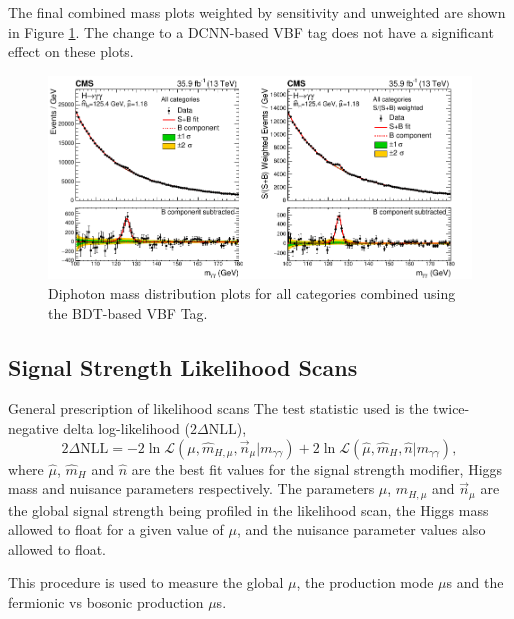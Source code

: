 The final combined mass plots weighted by sensitivity and unweighted are shown in Figure \ref{fig:stats_results:comb_mass_plots}. The change to a DCNN-based VBF tag does not have a significant effect on these plots.
\begin{figure}[h!]
    \begin{center}
        \includegraphics[width=1.0\textwidth]{figures/stats_results/CMS-HIG-16-040_Figure_014.pdf}
    \end{center}
    \caption{Diphoton mass distribution plots for all categories combined using the BDT-based VBF Tag.}
        \label{fig:stats_results:comb_mass_plots}
\end{figure}








\subsection{Signal Strength Likelihood Scans}
General prescription of likelihood scans
The test statistic used is the twice-negative delta log-likelihood ($2\Delta{\mathrm{NLL}}$), 
\begin{equation}
    2\Delta{\mathrm{NLL}} = -2\ln{\mathcal{L}}(\mu,\hat{m}_{H,\mu},\vec{n}_{\mu} | m_{\gamma\gamma}) + 2\ln\mathcal{L}(\hat{\mu},\hat{m}_{H},\hat{n} | m_{\gamma\gamma}),
\end{equation}
where $\hat{\mu}$, $\hat{m}_{H}$ and $\hat{n}$ are the best fit values for the signal strength modifier, Higgs mass and nuisance parameters respectively. 
The parameters $\mu$, $\hat{m}_{H,\mu}$ and $\vec{n}_{\mu}$ are the global signal strength being profiled in the likelihood scan, the Higgs mass allowed to float for a given value of $\mu$, and the nuisance parameter values also allowed to float. 

This procedure is used to measure the global $\mu$, the production mode $\mu$s and the fermionic vs bosonic production $\mu$s. 

